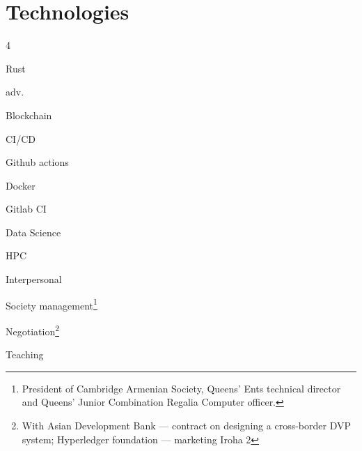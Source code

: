 \documentclass{CurriculumVitae}[10pt, condensed]
\begin{document}
\vfill
\pagebreak
\section*{Technologies}
\vfill
  \begin{multicols}{4}
    \begin{skills}{Rust}
    \item adv.~
    \item {}
    \item {}
    \item {}
    \item {}
    \end{skills}

    \begin{skills}{Blockchain}
    \item {}
    \item {}
    \item {}
    \item {}
    \end{skills}

    \begin{skills}{CI/CD}
    \item Github actions
    \item Docker
    \item {}
    \item {}
    \item Gitlab CI
    \end{skills}

    \begin{skills}{Data Science}
    \item {}
    \item {}
    \item {}
    \item {}
    \end{skills}

    \begin{skills}{HPC}
    \item {}
    \item {}
    \item {}
    \end{skills}

    \begin{skills}{Interpersonal}
    \item Society management\footnote{President of Cambridge Armenian
        Society, Queens' Ents technical director and Queens' Junior
        Combination Regalia Computer officer. }
    \item Negotiation\footnote{With Asian Development Bank ---
        contract on designing a cross-border DVP system; Hyperledger
        foundation ---  marketing Iroha 2}
    \item Teaching
    \end{skills}


\end{multicols}
\end{document}
